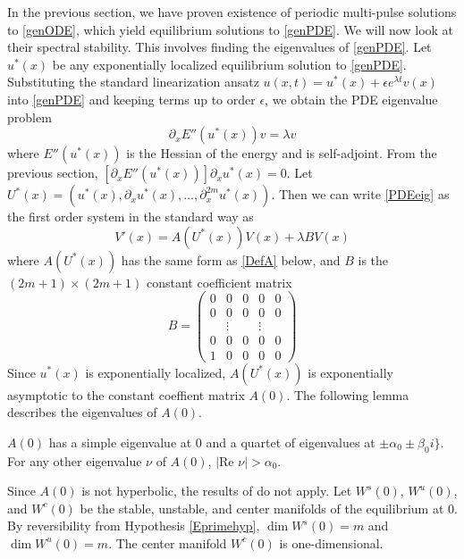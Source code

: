 \documentclass[thesis.tex]{subfiles}
\begin{document}
In the previous section, we have proven existence of periodic multi-pulse solutions to \eqref{genODE}, which yield equilibrium solutions to \eqref{genPDE}. We will now look at their spectral stability. This involves finding the eigenvalues of \eqref{genPDE}. Let $u^*(x)$ be any exponentially localized equilibrium solution to \eqref{genPDE}. Substituting the standard linearization ansatz $u(x, t) = u^*(x) + \epsilon e^{\lambda t}v(x)$ into \eqref{genPDE} and keeping terms up to order $\epsilon$, we obtain the PDE eigenvalue problem
\begin{equation}\label{PDEeig}
\partial_x E''(u^*(x)) v = \lambda v
\end{equation}
where $E''(u^*(x))$ is the Hessian of the energy and is self-adjoint. From the previous section, $[\partial_x E''(u^*(x))] \partial_x u^*(x) = 0$. Let $U^*(x) = (u^*(x), \partial_x u^*(x), \dots, \partial_x^{2m}u^*(x))$. Then we can write \eqref{PDEeig} as the first order system in the standard way as
\begin{equation}\label{PDEeig2}
V'(x) = A(U^*(x))V(x) + \lambda B V(x)
\end{equation}
where $A(U^*(x))$ has the same form as \eqref{DefA} below, and $B$ is the $(2m+1) \times (2m+1)$ constant coefficient matrix
\begin{equation}\label{DefB}
B = \begin{pmatrix}0 & 0 & 0 & 0 & 0 \\0 & 0 & 0 & 0 & 0 \\  & 
\vdots & & \vdots & \\0 & 0 & 0 & 0 & 0 \\1 & 0 & 0 & 0 & 0 \end{pmatrix} 
\end{equation}
Since $u^*(x)$ is exponentially localized, $A(U^*(x))$ is exponentially asymptotic to the constant coeffient matrix $A(0)$. The following lemma describes the eigenvalues of $A(0)$.

\begin{lemma}\label{eigA0lemma}
$A(0)$ has a simple eigenvalue at 0 and a quartet of eigenvalues at $\pm \alpha_0 \pm \beta_0 i\}$. For any other eigenvalue $\nu$ of $A(0)$, $|\text{Re }\nu| > \alpha_0$. 
\end{lemma}

Since $A(0)$ is not hyperbolic, the results of \cite{Sandstede1998} do not apply. Let $W^s(0)$, $W^u(0)$, and $W^c(0)$ be the stable, unstable, and center manifolds of the equilibrium at 0. By reversibility from Hypothesis \ref{Eprimehyp}, $\dim W^s(0) = m$ and $\dim W^u(0) = m$. The center manifold $W^c(0)$ is one-dimensional.
\end{document}
